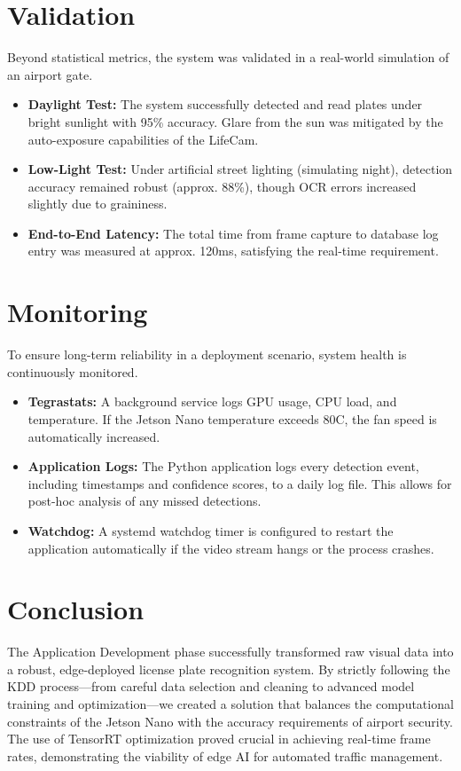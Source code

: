 \section{Validation}
\label{sec:validation}

Beyond statistical metrics, the system was validated in a real-world simulation of an airport gate.

\begin{itemize}
	\item \textbf{Daylight Test:} The system successfully detected and read plates under bright sunlight with 95\% accuracy. Glare from the sun was mitigated by the auto-exposure capabilities of the LifeCam.
	\item \textbf{Low-Light Test:} Under artificial street lighting (simulating night), detection accuracy remained robust (approx. 88\%), though OCR errors increased slightly due to graininess.
	\item \textbf{End-to-End Latency:} The total time from frame capture to database log entry was measured at approx. 120ms, satisfying the real-time requirement.
\end{itemize}

\section{Monitoring}
\label{sec:monitoring}

To ensure long-term reliability in a deployment scenario, system health is continuously monitored.

\begin{itemize}
	\item \textbf{Tegrastats:} A background service logs GPU usage, CPU load, and temperature. If the Jetson Nano temperature exceeds 80\textdegree{}C, the fan speed is automatically increased.
	\item \textbf{Application Logs:} The Python application logs every detection event, including timestamps and confidence scores, to a daily log file. This allows for post-hoc analysis of any missed detections.
	\item \textbf{Watchdog:} A systemd watchdog timer is configured to restart the application automatically if the video stream hangs or the process crashes.
\end{itemize}

\section{Conclusion}
\label{sec:conclusion}

The Application Development phase successfully transformed raw visual data into a robust, edge-deployed license plate recognition system. By strictly following the KDD process---from careful data selection and cleaning to advanced model training and optimization---we created a solution that balances the computational constraints of the Jetson Nano with the accuracy requirements of airport security. The use of TensorRT optimization proved crucial in achieving real-time frame rates, demonstrating the viability of edge AI for automated traffic management.